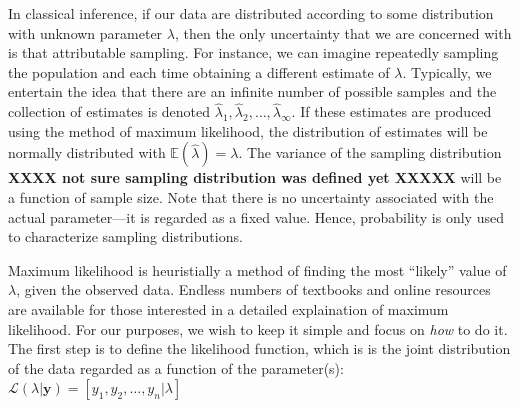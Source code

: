 In classical inference, if our data are distributed according to some
distribution with unknown parameter $\lambda$, then the only
uncertainty that we are concerned with is that attributable
sampling. For instance, we can imagine repeatedly sampling the
population and each time obtaining a different estimate of
$\lambda$. Typically, we entertain the idea that there are an infinite
number of possible samples and the collection of estimates is denoted
$\hat{\lambda}_1, \hat{\lambda}_2, \hdots, \hat{\lambda}_\infty$. If
these estimates are produced using the method of maximum likelihood,
the distribution of estimates will be normally distributed with
$\mathbb{E}(\hat{\lambda})=\lambda$. The variance of the sampling
distribution {\bf XXXX not sure sampling distribution was defined yet
  XXXXX}
will be a function of sample size. Note that there is
no uncertainty associated with the actual parameter---it is regarded
as a fixed value. Hence, probability is only used to characterize
sampling distributions.

Maximum likelihood is heuristially a method of finding the most ``likely''
value of $\lambda$, given the observed data. Endless numbers of
textbooks and online resources are available for those interested in a
detailed explaination of maximum likelihood. For our purposes, we wish
to keep it simple and focus on \textit{how} to do it. The first step
is to define the likelihood function, which is
is the joint distribution of the data regarded as a function of
the parameter(s):
$\mathcal{L}(\lambda | \mathbf{y}) = [y_1, y_2, \dots, y_n | \lambda]$


